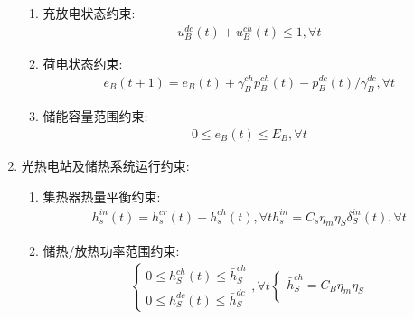 \documentclass{article}
\begin{document}
\begin{enumerate}
{\begin{enumerate}
{\begin{align}
\begin{cases}
                        0\leq p_B^{dc}(t)\leq u_B^{dc}(t)\cdot C_B^{max}\\
                        0\leq p_B^{ch}(t)\leq u_B^{ch}(t)\cdot C_B^{max}\\
                        0\leq p_B^{dc}(t)\leq C_B\\
                        0\leq p_B^{ch}(t)\leq C_B
                    \end{cases},\forall t
                \end{align}
            }
            \item {充放电状态约束:
                \begin{align}
                    u_B^{dc}(t)+u_B^{ch}(t)\leq1,\forall t
                \end{align}
            }
            \item {荷电状态约束:
                \begin{align}
                    e_B(t+1){=}e_B(t){+}\gamma_B^{ch}p_B^{ch}(t){-}p_B^{dc}(t)/\gamma_B^{dc},\forall t
                \end{align}
            }
            \item {储能容量范围约束:
                \begin{align}
                    0\leq e_B(t)\leq E_B,\forall t
                \end{align}
            }
        \end{enumerate}
    }
    \item {光热电站及储热系统运行约束:
        \begin{enumerate}
            \item {集热器热量平衡约束:
                \begin{align}
                    h_{s}^{in}(t)=h_{s}^{cr}(t)+h_{s}^{ch}(t),\forall t
                    h^{in}_{s} = C_s \eta_m \eta_S \delta_S^{in}(t), \forall t
                \end{align}
            }
            \item {储热/放热功率范围约束:
                \begin{align}
                    \begin{cases}
                        0\le h_S^{ch}(t)\le\bar{h}_S^{ch}\\
                        0\le h_S^{dc}(t)\le\bar{h}_S^{dc}
                    \end{cases},\forall t
                    \begin{cases}
                        \bar{h}_S^{ch}=C_B\eta_m \eta_S\\

\end{cases}
\end{align}}
\end{enumerate}}
\end{enumerate}
\end{document}
